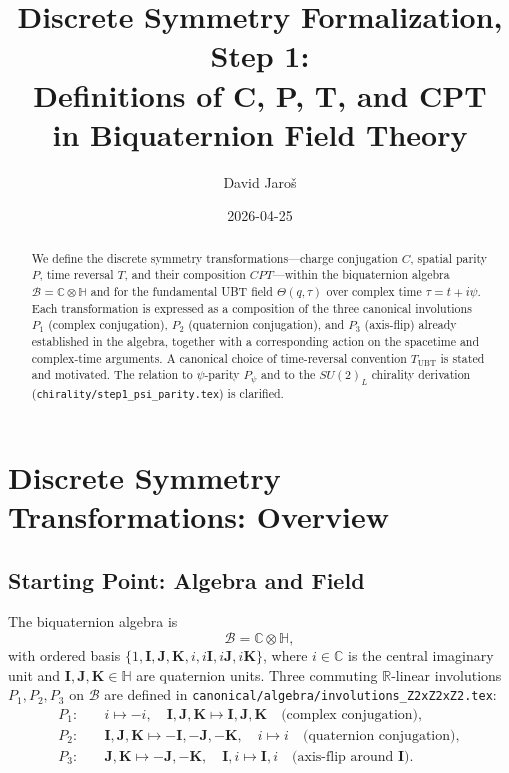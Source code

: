 \documentclass[12pt,a4paper]{article}
\title{\textbf{Discrete Symmetry Formalization, Step 1:\\
                 Definitions of C, P, T, and CPT\\
                 in Biquaternion Field Theory}}
\author{David Jaro\v{s}}
\date{2026-04-25}
\theoremstyle{definition}
\theoremstyle{remark}
\begin{document}
  \maketitle

  \begin{abstract}
  We define the discrete symmetry transformations---charge conjugation $C$,
  spatial parity $P$, time reversal $T$, and their composition $CPT$---within
  the biquaternion algebra $\mathcal{B} = \mathbb{C} \otimes \mathbb{H}$ and
  for the fundamental UBT field $\Theta(q,\tau)$ over complex time
  $\tau = t + i\psi$.
  Each transformation is expressed as a composition of the three canonical
  involutions $P_1$ (complex conjugation), $P_2$ (quaternion conjugation), and
  $P_3$ (axis-flip) already established in the algebra, together with a
  corresponding action on the spacetime and complex-time arguments.
  A canonical choice of time-reversal convention $T_{\mathrm{UBT}}$ is stated
  and motivated.  The relation to $\psi$-parity $P_\psi$ and to the
  $SU(2)_L$ chirality derivation (\texttt{chirality/step1\_psi\_parity.tex})
  is clarified.
  \end{abstract}
\fi

\section{Discrete Symmetry Transformations: Overview}
\label{sec:sym:overview}

\subsection{Starting Point: Algebra and Field}

The biquaternion algebra is
\begin{equation}
  \mathcal{B} = \mathbb{C} \otimes \mathbb{H},
  \label{eq:sym:B}
\end{equation}
with ordered basis
$\{1, \mathbf{I}, \mathbf{J}, \mathbf{K}, i, i\mathbf{I}, i\mathbf{J},
i\mathbf{K}\}$,
where $i \in \mathbb{C}$ is the central imaginary unit and
$\mathbf{I}, \mathbf{J}, \mathbf{K} \in \mathbb{H}$ are quaternion units.
Three commuting $\mathbb{R}$-linear involutions $P_1, P_2, P_3$ on
$\mathcal{B}$ are defined in
\texttt{canonical/algebra/involutions\_Z2xZ2xZ2.tex}:
\begin{align}
  P_1: &\quad i \mapsto -i,\quad \mathbf{I},\mathbf{J},\mathbf{K}
        \mapsto \mathbf{I},\mathbf{J},\mathbf{K}
        \quad \text{(complex conjugation)}, \label{eq:sym:P1} \\
  P_2: &\quad \mathbf{I},\mathbf{J},\mathbf{K} \mapsto
        -\mathbf{I},-\mathbf{J},-\mathbf{K},\quad i \mapsto i
        \quad \text{(quaternion conjugation)}, \label{eq:sym:P2} \\
  P_3: &\quad \mathbf{J},\mathbf{K} \mapsto -\mathbf{J},-\mathbf{K},
        \quad \mathbf{I},i \mapsto \mathbf{I},i
        \quad \text{(axis-flip around $\mathbf{I}$)}. \label{eq:sym:P3}
\end{align}
\end{document}

